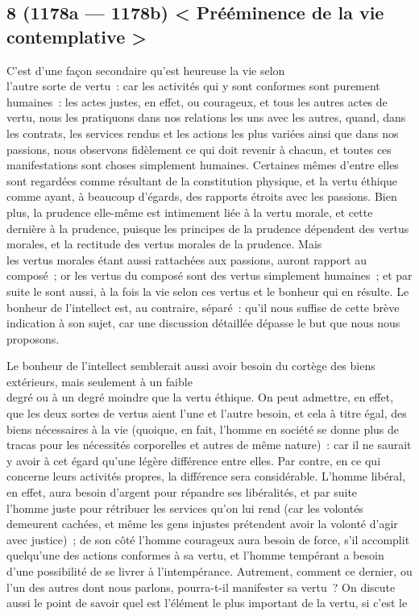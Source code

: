\documentclass[french,twoside]{book} %
\begin{document}
\subsection[{8 (1178a — 1178b) < Prééminence de la vie contemplative >}]{8 (1178a — 1178b) < Prééminence de la vie contemplative >}
\noindent C’est d’une façon secondaire qu’est heureuse la vie selon \\
l’autre sorte de vertu : car les activités qui y sont conformes sont purement humaines : les actes justes, en effet, ou courageux, et tous les autres actes de vertu, nous les pratiquons dans nos relations les uns avec les autres, quand, dans les contrats, les services rendus et les actions les plus variées ainsi que dans nos passions, nous observons fidèlement ce qui doit revenir à chacun, et toutes ces manifestations sont choses simplement humaines. Certaines mêmes d’entre elles sont regardées comme résultant de la constitution physique, et la vertu éthique \\
comme ayant, à beaucoup d’égards, des rapports étroits avec les passions. Bien plus, la prudence elle-même est intimement liée à la vertu morale, et cette dernière à la prudence, puisque les principes de la prudence dépendent des vertus morales, et la rectitude des vertus morales de la prudence. Mais \\
les vertus morales étant aussi rattachées aux passions, auront rapport au composé ; or les vertus du composé sont des vertus simplement humaines ; et par suite le sont aussi, à la fois la vie selon ces vertus et le bonheur qui en résulte. Le bonheur de l’intellect est, au contraire, séparé : qu’il nous suffise de cette brève indication à son sujet, car une discussion détaillée dépasse le but que nous nous proposons.\par
Le bonheur de l’intellect semblerait aussi avoir besoin du cortège des biens extérieurs, mais seulement à un faible \\
degré ou à un degré moindre que la vertu éthique. On peut admettre, en effet, que les deux sortes de vertus aient l’une et l’autre besoin, et cela à titre égal, des biens nécessaires à la vie (quoique, en fait, l’homme en société se donne plus de tracas pour les nécessités corporelles et autres de même nature) : car il ne saurait y avoir à cet égard qu’une légère différence entre elles. Par contre, en ce qui concerne leurs activités propres, la différence sera considérable. L’homme libéral, en effet, aura besoin d’argent pour répandre ses libéralités, et par suite \\
l’homme juste pour rétribuer les services qu’on lui rend (car les volontés demeurent cachées, et même les gens injustes prétendent avoir la volonté d’agir avec justice) ; de son côté l’homme courageux aura besoin de force, s’il accomplit quelqu’une des actions conformes à sa vertu, et l’homme tempérant a besoin d’une possibilité de se livrer à l’intempérance. Autrement, comment ce dernier, ou l’un des autres dont nous parlons, pourra-t-il manifester sa vertu ? On discute aussi le point de savoir quel est l’élément le plus important de la vertu, si c’est le \\
\end{document}
